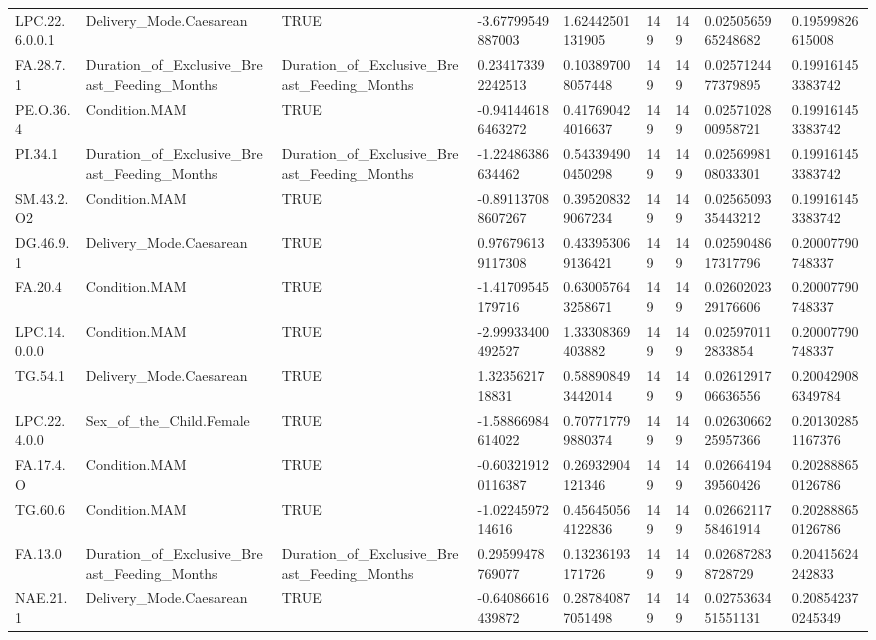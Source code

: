 \begin{longtable}{lllllllll}
LPC.22.6.0.0.1 & Delivery\_Mode.Caesarean & TRUE & -3.67799549887003 & 1.62442501131905 & 149 & 149 & 0.0250565965248682 & 0.19599826615008 \\
FA.28.7.1 & Duration\_of\_Exclusive\_Breast\_Feeding\_Months & Duration\_of\_Exclusive\_Breast\_Feeding\_Months & 0.234173392242513 & 0.103897008057448 & 149 & 149 & 0.0257124477379895 & 0.199161453383742 \\
PE.O.36.4 & Condition.MAM & TRUE & -0.941446186463272 & 0.417690424016637 & 149 & 149 & 0.0257102800958721 & 0.199161453383742 \\
PI.34.1 & Duration\_of\_Exclusive\_Breast\_Feeding\_Months & Duration\_of\_Exclusive\_Breast\_Feeding\_Months & -1.22486386634462 & 0.543394900450298 & 149 & 149 & 0.0256998108033301 & 0.199161453383742 \\
SM.43.2.O2 & Condition.MAM & TRUE & -0.891137088607267 & 0.395208329067234 & 149 & 149 & 0.0256509335443212 & 0.199161453383742 \\
DG.46.9.1 & Delivery\_Mode.Caesarean & TRUE & 0.976796139117308 & 0.433953069136421 & 149 & 149 & 0.0259048617317796 & 0.20007790748337 \\
FA.20.4 & Condition.MAM & TRUE & -1.41709545179716 & 0.630057643258671 & 149 & 149 & 0.0260202329176606 & 0.20007790748337 \\
LPC.14.0.0.0 & Condition.MAM & TRUE & -2.99933400492527 & 1.33308369403882 & 149 & 149 & 0.025970112833854 & 0.20007790748337 \\
TG.54.1 & Delivery\_Mode.Caesarean & TRUE & 1.3235621718831 & 0.588908493442014 & 149 & 149 & 0.0261291706636556 & 0.200429086349784 \\
LPC.22.4.0.0 & Sex\_of\_the\_Child.Female & TRUE & -1.58866984614022 & 0.707717799880374 & 149 & 149 & 0.0263066225957366 & 0.201302851167376 \\
FA.17.4.O & Condition.MAM & TRUE & -0.603219120116387 & 0.26932904121346 & 149 & 149 & 0.0266419439560426 & 0.202888650126786 \\
TG.60.6 & Condition.MAM & TRUE & -1.0224597214616 & 0.456450564122836 & 149 & 149 & 0.0266211758461914 & 0.202888650126786 \\
FA.13.0 & Duration\_of\_Exclusive\_Breast\_Feeding\_Months & Duration\_of\_Exclusive\_Breast\_Feeding\_Months & 0.29599478769077 & 0.13236193171726 & 149 & 149 & 0.026872838728729 & 0.20415624242833 \\
NAE.21.1 & Delivery\_Mode.Caesarean & TRUE & -0.64086616439872 & 0.287840877051498 & 149 & 149 & 0.0275363451551131 & 0.208542370245349 \\

\end{longtable}
